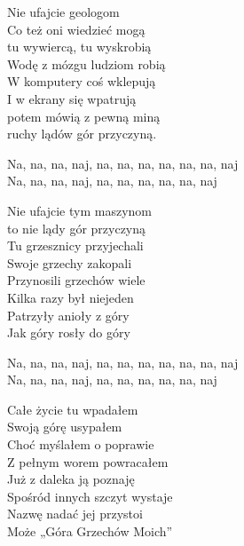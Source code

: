 \begin{text}
    Nie ufajcie geologom\\
    Co też oni wiedzieć mogą\\
    tu wywiercą, tu wyskrobią\\
    Wodę z mózgu ludziom robią\\
    W komputery coś wklepują\\
    I w ekrany się wpatrują\\
    potem mówią z pewną miną\\
    ruchy lądów gór przyczyną.

    \vin Na, na, na, naj, na, na, na, na, na, na, naj\\ 
    \vin Na, na, na, naj, na, na, na, na, na, naj

    Nie ufajcie tym maszynom\\
    to nie lądy gór przyczyną\\
    Tu grzesznicy przyjechali\\
    Swoje grzechy zakopali\\
    Przynosili grzechów wiele\\
    Kilka razy był niejeden\\
    Patrzyły anioły z góry\\
    Jak góry rosły do góry

    \vin Na, na, na, naj, na, na, na, na, na, na, naj\\ 
    \vin Na, na, na, naj, na, na, na, na, na, naj

    Całe życie tu wpadałem\\
    Swoją górę usypałem\\
    Choć myślałem o poprawie\\
    Z pełnym worem powracałem\\
    Już z daleka ją poznaję\\
    Spośród innych szczyt wystaje\\
    Nazwę nadać jej przystoi\\
    Może „Góra Grzechów Moich”

 
 
\end{text}
